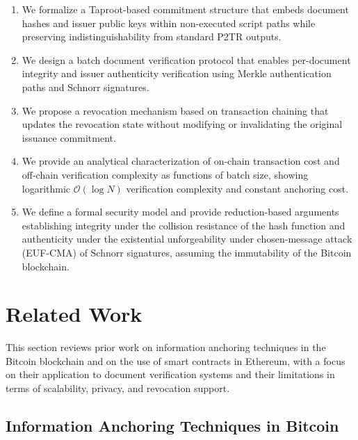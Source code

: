 \documentclass{IEEEoj}
\begin{document}
\begin{enumerate}
    \item We formalize a Taproot-based commitment structure that embeds document hashes and issuer public keys within non-executed script paths while preserving indistinguishability from standard P2TR outputs.
    
    \item We design a batch document verification protocol that enables per-document integrity and issuer authenticity verification using Merkle authentication paths and Schnorr signatures.
    
    \item We propose a revocation mechanism based on transaction chaining that updates the revocation state without modifying or invalidating the original issuance commitment.
    
    \item We provide an analytical characterization of on-chain transaction cost and off-chain verification complexity as functions of batch size, showing logarithmic $\mathcal{O}(\log N)$ verification complexity and constant anchoring cost.
    
    \item We define a formal security model and provide reduction-based arguments establishing integrity under the collision resistance of the hash function and authenticity under the existential unforgeability under chosen-message attack (EUF-CMA) of Schnorr signatures, assuming the immutability of the Bitcoin blockchain.
\end{enumerate}



\section{Related Work}
\label{sec.relatedwork}

This section reviews prior work on information anchoring techniques in the Bitcoin blockchain and on the use of smart contracts in Ethereum, with a focus on their application to document verification systems and their limitations in terms of scalability, privacy, and revocation support.

\subsection{Information Anchoring Techniques in Bitcoin}
\label{sec.methodsbitcoin}
\end{document}
